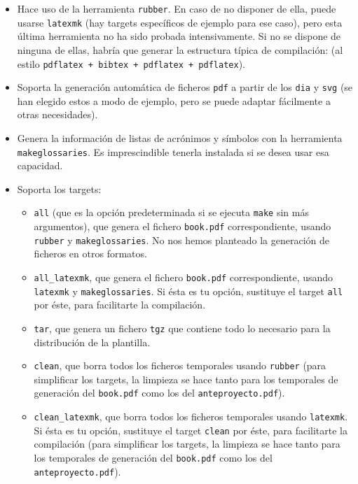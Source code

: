 \begin{itemize}

  \item Hace uso de la herramienta \texttt{rubber}. En caso de no disponer de ella, puede usarse \texttt{latexmk} (hay targets específicos de ejemplo para ese caso), pero esta última herramienta no ha sido probada intensivamente. Si no se dispone de ninguna de ellas, habría que generar la estructura típica de compilación: (al estilo \texttt{pdflatex + bibtex + pdflatex + pdflatex}).
  \item Soporta la generación automática de ficheros \texttt{pdf} a partir de los \texttt{dia} y \texttt{svg} (se han elegido estos a modo de ejemplo, pero se puede adaptar fácilmente a otras necesidades).
  \item Genera la información de listas de acrónimos y símbolos con la herramienta \texttt{makeglossaries}. Es imprescindible tenerla instalada si se desea usar esa capacidad.
  \item Soporta los targets:
        \begin{itemize}
          \item \texttt{all} (que es la opción predeterminada si se ejecuta \texttt{make} sin más argumentos), que genera el fichero \texttt{book.pdf} correspondiente, usando \texttt{rubber} y \texttt{makeglossaries}. No nos hemos planteado la generación de ficheros en otros formatos.
          \item \texttt{all\_latexmk}, que genera el fichero \texttt{book.pdf} correspondiente, usando \texttt{latexmk} y \texttt{makeglossaries}. Si ésta es tu opción, sustituye el target \texttt{all} por éste, para facilitarte la compilación.

          \item \texttt{tar}, que genera un fichero \texttt{tgz} que contiene todo lo necesario para la distribución de la plantilla.
          \item \texttt{clean}, que borra todos los ficheros temporales usando \texttt{rubber} (para simplificar los targets, la limpieza se hace tanto para los temporales de generación del \texttt{book.pdf} como los del \texttt{anteproyecto.pdf}).
          \item \texttt{clean\_latexmk}, que borra todos los ficheros temporales usando \texttt{latexmk}. Si ésta es tu opción, sustituye el target \texttt{clean} por éste, para facilitarte la compilación (para simplificar los targets, la limpieza se hace tanto para los temporales de generación del \texttt{book.pdf} como los del \texttt{anteproyecto.pdf}).

        \end{itemize}

\end{itemize}


